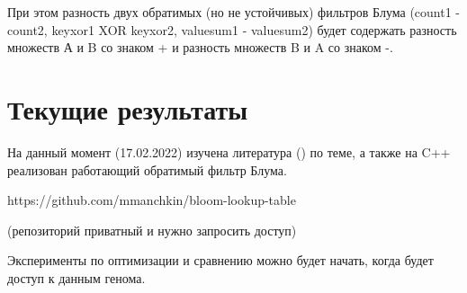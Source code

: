 \documentclass{article}
\begin{document}
При этом разность двух обратимых (но не устойчивых) фильтров Блума (count1 - count2, keyxor1 XOR keyxor2, valuesum1 - valuesum2)
будет содержать разность множеств А и B со знаком + и разность множеств B и A со знаком -.


\section{Текущие результаты}
На данный момент (17.02.2022) изучена литература (\textcite{GoMi2011}) по теме, а также на C++ реализован работающий обратимый фильтр Блума.

https://github.com/mmanchkin/bloom-lookup-table

(репозиторий приватный и нужно запросить доступ)


Эксперименты по оптимизации и сравнению можно будет начать, когда будет доступ к данным генома.




\end{document}
